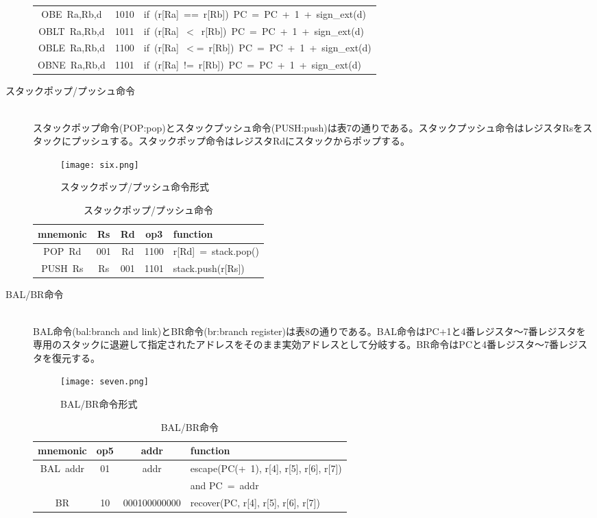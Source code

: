 \documentclass{jarticle}
\begin{document}
\begin{description}
\begin{table}[H]
\begin{tabular}{|c|c|l|}
  OBE\ Ra,Rb,d & 1010 & if\ (r[Ra]\ ==\ r[Rb])\ PC\ =\ PC\ +\ 1\ +\ sign\_ext(d) \\
  OBLT\ Ra,Rb,d & 1011 & if\ (r[Ra]\ $<$\ r[Rb])\ PC\ =\ PC\ +\ 1\ +\ sign\_ext(d) \\
  OBLE\ Ra,Rb,d & 1100 & if\ (r[Ra]\ $<$=\ r[Rb])\ PC\ =\ PC\ +\ 1\ +\ sign\_ext(d) \\
  OBNE\ Ra,Rb,d & 1101 & if\ (r[Ra]\ !=\ r[Rb])\ PC\ =\ PC\ +\ 1\ +\ sign\_ext(d) \\ \hline
  \end{tabular}
\end{table}
\item[スタックポップ/プッシュ命令] \leavevmode \\
スタックポップ命令(POP:pop)とスタックプッシュ命令(PUSH:push)は表7の通りである。スタックプッシュ命令はレジスタRsをスタックにプッシュする。スタックポップ命令はレジスタRdにスタックからポップする。
\begin{figure}[H]
  \centering
  \caption{スタックポップ/プッシュ命令形式}
  \texttt{[image: six.png]}
\end{figure}
\begin{table}[H]
  \centering
  \caption{スタックポップ/プッシュ命令}
  \begin{tabular}{|c|c|c|c|l|} \hline
  mnemonic & Rs & Rd & op3 & function \\ \hline
  POP\ Rd & 001 & Rd & 1100 & r[Rd]\ =\ stack.pop() \\
  PUSH\ Rs & Rs & 001 & 1101 & stack.push(r[Rs]) \\ \hline
  \end{tabular}
\end{table}
\item[BAL/BR命令] \leavevmode \\
BAL命令(bal:branch and link)とBR命令(br:branch register)は表8の通りである。BAL命令はPC+1と4番レジスタ～7番レジスタを専用のスタックに退避して指定されたアドレスをそのまま実効アドレスとして分岐する。BR命令はPCと4番レジスタ～7番レジスタを復元する。
\begin{figure}[H]
  \centering
  \caption{BAL/BR命令形式}
  \texttt{[image: seven.png]}
\end{figure}
\begin{table}[H]
  \centering
  \caption{BAL/BR命令}
  \begin{tabular}{|c|c|c|l|} \hline
  mnemonic & op5 & addr & function \\ \hline
  BAL\ addr & 01 & addr & escape(PC(+\ 1), r[4], r[5], r[6], r[7]) \\ 
            &    &      & and PC\ =\ addr \\
  BR & 10 & 000100000000 & recover(PC, r[4], r[5], r[6], r[7]) \\ \hline
  \end{tabular}
\end{table}
\end{description}
\end{document}
